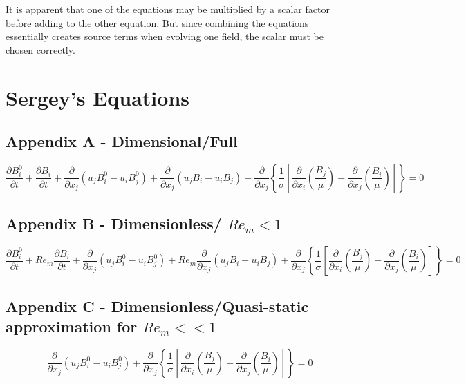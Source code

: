 \documentclass[11pt]{article}
\begin{document}
It is apparent that one of the equations may be multiplied by a scalar factor before adding to the other equation. But since combining the equations essentially creates source terms when evolving one field, the scalar must be chosen correctly.

\section{Sergey's Equations}

\subsection{Appendix A - Dimensional/Full}

\begin{equation*}
	\frac{\partial B_i^0}{\partial t}
	+
	\frac{\partial B_i}{\partial t} 
	+ 
	\frac{\partial}{\partial x_j} (u_j B_i^0 - u_i B_j^0) 
	+
	\frac{\partial}{\partial x_j} (u_j B_i - u_i B_j) 
	+ 
	\frac{\partial}{\partial x_j} 
	\left\{ \frac{1}{\sigma} 
	\left[ 
	\frac{\partial}{\partial x_i} 
	\left( \frac{B_j}{\mu} \right) 
	- 
	\frac{\partial}{\partial x_j} 
	\left( \frac{B_i}{\mu} \right)
	\right]
	\right\}
	= 
	0
\end{equation*}


\subsection{Appendix B - Dimensionless/ \texorpdfstring{$Re_m<1$}{LG}}

\begin{equation*}
	\frac{\partial B_i^0}{\partial t}
	+
 	Re_m
	\frac{\partial B_i}{\partial t} 
	+ 
	\frac{\partial}{\partial x_j} (u_j B_i^0 - u_i B_j^0) 
	+
 	Re_m
	\frac{\partial}{\partial x_j} (u_j B_i - u_i B_j) 
	+ 
	\frac{\partial}{\partial x_j} 
	\left\{ \frac{1}{\sigma} 
	\left[ 
	\frac{\partial}{\partial x_i} 
	\left( \frac{B_j}{\mu} \right) 
	- 
	\frac{\partial}{\partial x_j} 
	\left( \frac{B_i}{\mu} \right)
	\right]
	\right\}
	= 
	0
\end{equation*}


\subsection{Appendix C - Dimensionless/Quasi-static approximation for \texorpdfstring{$Re_m<<1$}{LG}}

\begin{equation*}
	\frac{\partial}{\partial x_j} (u_j B_i^0 - u_i B_j^0) 
	+ 
	\frac{\partial}{\partial x_j} 
	\left\{ \frac{1}{\sigma} 
	\left[ 
	\frac{\partial}{\partial x_i} 
	\left( \frac{B_j}{\mu} \right) 
	- 
	\frac{\partial}{\partial x_j} 
	\left( \frac{B_i}{\mu} \right)
	\right]
	\right\}
	= 
	0
\end{equation*}
\end{document}
